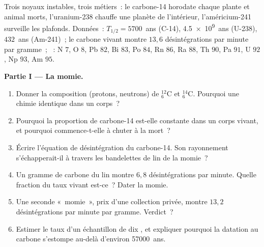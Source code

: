 \begin{problem}
\label{pb:g11:nucleus-radioactivity:1}
Trois noyaux instables, trois métiers~: le carbone-14 horodate chaque
plante et animal morts, l'uranium-238 chauffe une planète de l'intérieur,
l'américium-241 surveille les plafonds. Données~:
$T_{1/2} = \num{5700}$~ans (C-14), \num{4.5e9}~ans (U-238), $432$~ans
(Am-241)~; le carbone vivant montre $13{,}6$ désintégrations par minute
par gramme~; ~:
N $7$, O $8$, Pb $82$, Bi $83$, Po $84$, Rn $86$, Ra $88$, Th $90$, Pa
$91$, U $92$, Np $93$, Am $95$.

\medskip
\noindent\textbf{Partie I --- La momie.}
\begin{enumerate}
  \item Donner la composition (protons, neutrons) de
        ${}^{12}_{6}\mathrm{C}$ et ${}^{14}_{6}\mathrm{C}$. Pourquoi une
        chimie identique dans un corps~?
  \item Pourquoi la proportion de carbone-14 est-elle constante dans un
        corps vivant, et pourquoi commence-t-elle à chuter à la mort~?
  \item Écrire l'équation de désintégration du carbone-14. Son
        rayonnement s'échapperait-il à travers les bandelettes de lin de
        la momie~?
  \item Un gramme de carbone du lin montre $6{,}8$ désintégrations par
        minute. Quelle fraction du taux vivant est-ce~? Dater la momie.
  \item Une seconde «~momie~», prix d'une collection privée, montre
        $13{,}2$ désintégrations par minute par gramme. Verdict~?
  \item Estimer le taux d'un échantillon de dix , et expliquer
        pourquoi la datation au carbone s'estompe au-delà d'environ
        \num{57000}~ans.
\end{enumerate}


\end{problem}

